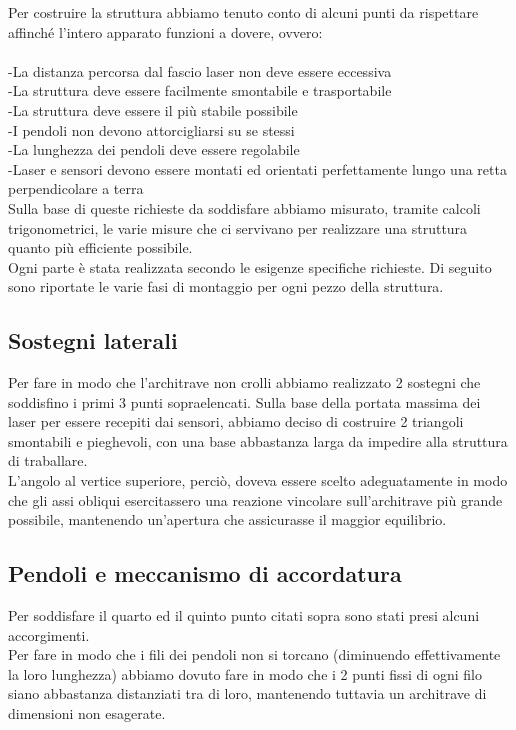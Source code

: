 \documentclass[a4paper]{article}
\begin{document}
Per costruire la struttura abbiamo tenuto conto di alcuni punti da rispettare affinché l'intero apparato funzioni a dovere, ovvero:\\\\
-La distanza percorsa dal fascio laser non deve essere eccessiva\\
-La struttura deve essere facilmente smontabile e trasportabile\\
-La struttura deve essere il più stabile possibile\\
-I pendoli non devono attorcigliarsi su se stessi\\
-La lunghezza dei pendoli deve essere regolabile\\
-Laser e sensori devono essere montati ed orientati perfettamente lungo una retta perpendicolare a terra\\

Sulla base di queste richieste da soddisfare abbiamo misurato, tramite calcoli trigonometrici, le varie misure che ci servivano per realizzare una struttura quanto più efficiente possibile.\\
Ogni parte è stata realizzata secondo le esigenze specifiche richieste. Di seguito sono riportate le varie fasi di montaggio per ogni pezzo della struttura.

\subsection{Sostegni laterali}

Per fare in modo che l'architrave non crolli abbiamo realizzato 2 sostegni che soddisfino i primi 3 punti sopraelencati. Sulla base della portata massima dei laser per essere recepiti dai sensori, abbiamo deciso di costruire 2 triangoli smontabili e pieghevoli, con una base abbastanza larga da impedire alla struttura di traballare.\\
L'angolo al vertice superiore, perciò, doveva essere scelto adeguatamente in modo che gli assi obliqui esercitassero una reazione vincolare sull'architrave più grande possibile, mantenendo un'apertura che assicurasse il maggior equilibrio.

\subsection{Pendoli e meccanismo di accordatura}

Per soddisfare il quarto ed il quinto punto citati sopra sono stati presi alcuni accorgimenti.\\
Per fare in modo che i fili dei pendoli non si torcano (diminuendo effettivamente la loro lunghezza) abbiamo dovuto fare in modo che i 2 punti fissi di ogni filo siano abbastanza distanziati tra di loro, mantenendo tuttavia un architrave di dimensioni non esagerate.\\
\end{document}
